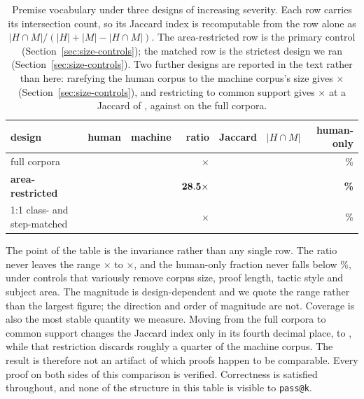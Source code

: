 \begin{table}[t]
\centering
\small
\begin{tabular}{lrrrrrr}
\toprule
design & human & machine & ratio & Jaccard & $|H \cap M|$ & human-only \\
\midrule
full corpora & \humanVocab{} & \machineVocab{} & \vocabRatio{}$\times$ & \jaccardFull{} & \intersectionFull{} & \humanOnlyFullPct{}\% \\
\textbf{area-restricted} & \textbf{\humanVocabAreaRestricted{}} & \textbf{\machineVocab{}} & $\mathbf{28.5\times}$ & \textbf{\areaRestrictedJaccard{}} & \textbf{\intersectionAreaRestricted{}} & \textbf{\areaRestrictedHumanOnlyPct{}\%} \\
1:1 class- and step-matched & \humanVocabMatched{} & \machineVocabMatched{} & \vocabRatioMatched{}$\times$ & \jaccardMatched{} & \intersectionMatched{} & \humanOnlyMatchedPct{}\% \\
\bottomrule
\end{tabular}
\caption{Premise vocabulary under three designs of increasing severity. Each
row carries its intersection count, so its Jaccard index is recomputable from
the row alone as $|H \cap M| / (|H| + |M| - |H \cap M|)$. The area-restricted
row is the primary control (Section~\ref{sec:size-controls}); the matched row
is the strictest design we ran (Section~\ref{sec:size-controls}). Two further
designs are reported in the text rather than here: rarefying the human corpus
to the machine corpus's size gives \vocabRatioRarefied{}$\times$
(Section~\ref{sec:size-controls}), and restricting to common support gives
\vocabRatioSupport{}$\times$ at a Jaccard of \jaccardSupport{}, against
\jaccardFull{} on the full corpora.}
\label{tab:coverage}
\end{table}



The point of the table is the invariance rather than any single row. The ratio
never leaves the range \vocabRatioMatched{}$\times$ to \vocabRatio{}$\times$,
and the human-only fraction never falls below \humanOnlyMatchedPct{}\%, under
controls that variously remove corpus size, proof length, tactic style and
subject area. The magnitude is design-dependent and we quote the range rather
than the largest figure; the direction and order of magnitude are not.
Coverage is also the most stable quantity we measure. Moving from the full
corpora to common support changes the Jaccard index only in its fourth decimal
place, \jaccardFull{} to \jaccardSupport{}, while that restriction discards
roughly a quarter of the machine corpus. The result is therefore not an
artifact of which proofs happen to be comparable. Every proof on both sides of
this comparison is verified. Correctness is satisfied throughout, and none of
the structure in this table is visible to \texttt{pass@k}.
